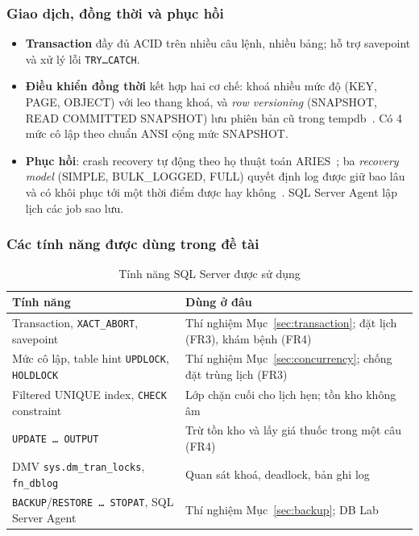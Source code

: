 \subsubsection{Giao dịch, đồng thời và phục hồi}
\begin{itemize}
    \item \textbf{Transaction} đầy đủ ACID trên nhiều câu lệnh, nhiều bảng; hỗ trợ savepoint và xử lý lỗi \texttt{TRY\ldots CATCH}.
    \item \textbf{Điều khiển đồng thời} kết hợp hai cơ chế: khoá nhiều mức độ (KEY, PAGE, OBJECT) với leo thang khoá, và \textit{row versioning} (SNAPSHOT, READ COMMITTED SNAPSHOT) lưu phiên bản cũ trong tempdb~\cite{mssql-locking}. Có 4 mức cô lập theo chuẩn ANSI cộng mức SNAPSHOT.
    \item \textbf{Phục hồi}: crash recovery tự động theo họ thuật toán ARIES~\cite{aries}; ba \textit{recovery model} (SIMPLE, BULK\_LOGGED, FULL) quyết định log được giữ bao lâu và có khôi phục tới một thời điểm được hay không~\cite{mssql-recovery}. SQL Server Agent lập lịch các job sao lưu.
\end{itemize}

\subsubsection{Các tính năng được dùng trong đề tài}

\begin{table}[H]
\centering
\caption{Tính năng SQL Server được sử dụng}
\label{tab:mssql-features}
\begin{tabularx}{\linewidth}{|p{4.6cm}|X|}
\hline
\textbf{Tính năng} & \textbf{Dùng ở đâu} \\ \hline
Transaction, \texttt{XACT\_ABORT}, savepoint & Thí nghiệm Mục~\ref{sec:transaction}; đặt lịch (FR3), khám bệnh (FR4) \\ \hline
Mức cô lập, table hint \texttt{UPDLOCK}, \texttt{HOLDLOCK} & Thí nghiệm Mục~\ref{sec:concurrency}; chống đặt trùng lịch (FR3) \\ \hline
Filtered UNIQUE index, \texttt{CHECK} constraint & Lớp chặn cuối cho lịch hẹn; tồn kho không âm \\ \hline
\texttt{UPDATE \ldots{} OUTPUT} & Trừ tồn kho và lấy giá thuốc trong một câu (FR4) \\ \hline
DMV \texttt{sys.dm\_tran\_locks}, \texttt{fn\_dblog} & Quan sát khoá, deadlock, bản ghi log \\ \hline
\texttt{BACKUP}/\texttt{RESTORE \ldots{} STOPAT}, SQL Server Agent & Thí nghiệm Mục~\ref{sec:backup}; DB Lab \\ \hline
\end{tabularx}
\end{table}

